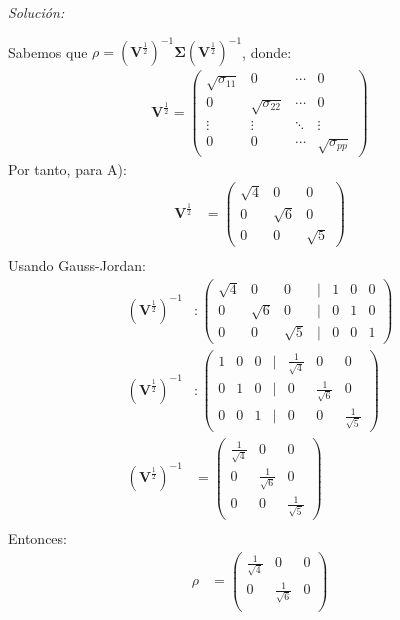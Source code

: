 \documentclass[12pt]{article}
\newenvironment{sol}
    {\emph{Solución:}
    }
    {
    }
\begin{document}
\begin{sol}
Sabemos que $\rho = (\mathbf{V}^{\frac{1}{2}})^{-1} \mathbf{\Sigma} (\mathbf{V}^{\frac{1}{2}})^{-1}$, donde:
\begin{align*}
\mathbf{V}^{\frac{1}{2}}=
\begin{pmatrix}
\sqrt{\sigma_{11}} & 0 & \cdots & 0 \\
0 & \sqrt{\sigma_{22}} & \cdots & 0 \\
\vdots & \vdots & \ddots & \vdots \\
0 & 0 & \cdots & \sqrt{\sigma_{pp}}
\end{pmatrix}
\end{align*}
Por tanto, para A):
\begin{align*}\mathbf{V}^{\frac{1}{2}} &=
\begin{pmatrix}
\sqrt{4} & 0 & 0 \\
0 & \sqrt{6} & 0 \\
0 & 0 & \sqrt{5}
\end{pmatrix}\\
\end{align*}
Usando Gauss-Jordan:
\begin{align*}
(\mathbf{V}^{\frac{1}{2}})^{-1} &:
\begin{pmatrix}
\sqrt{4} & 0 & 0 & \vert &1 & 0 & 0 \\
0 & \sqrt{6} & 0 & \vert &0 & 1 & 0 \\
0 & 0 & \sqrt{5} & \vert & 0 & 0 & 1 
\end{pmatrix}\\
(\mathbf{V}^{\frac{1}{2}})^{-1} &:
\begin{pmatrix}
1 & 0 & 0 & \vert &\frac{1}{\sqrt{4}} & 0 & 0 \\
0 & 1 & 0 & \vert &0 &\frac{1}{\sqrt{6}} & 0 \\
0 & 0 & 1 & \vert & 0 & 0 & \frac{1}{\sqrt{5}}
\end{pmatrix}\\
(\mathbf{V}^{\frac{1}{2}})^{-1} &= 
\begin{pmatrix}
\frac{1}{\sqrt{4}} & 0 & 0 \\
0 &\frac{1}{\sqrt{6}} & 0 \\
 0 & 0 & \frac{1}{\sqrt{5}}
\end{pmatrix}\\
\end{align*}
Entonces:
\begin{align*}
\rho &= \begin{pmatrix}
\frac{1}{\sqrt{4}} & 0 & 0 \\
0 &\frac{1}{\sqrt{6}} & 0 \\

\end{pmatrix}
\end{align*}
\end{sol}
\end{document}

